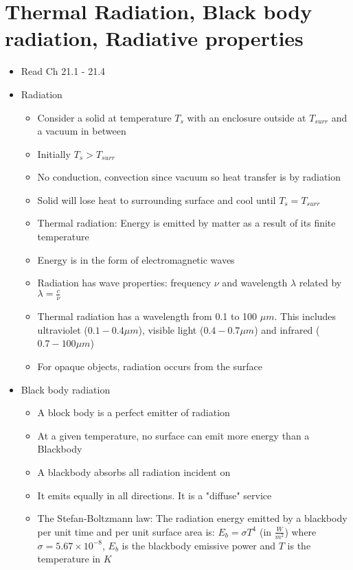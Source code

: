 \documentclass[12pt]{article}
\begin{document}
\section{Thermal Radiation, Black body radiation, Radiative properties}

\begin{itemize}
    \item Read Ch 21.1 - 21.4
    \item Radiation \begin{itemize}
        \item Consider a solid at temperature $T_s$ with an enclosure outside at $T_{surr}$ and a vacuum in between
        \item Initially $T_s > T_{surr}$
        \item No conduction, convection since vacuum so heat transfer is by radiation
        \item Solid will lose heat to surrounding surface and cool until $T_s = T_{surr}$
        \item Thermal radiation: Energy is emitted by matter as a result of its finite temperature
        \item Energy is in the form of electromagnetic waves
        \item Radiation has wave properties: frequency $\nu$ and wavelength $\lambda$ related by $\lambda = \frac{c}{\nu}$
        \item Thermal radiation has a wavelength from 0.1 to 100 $\mu m$. This includes ultraviolet ($0.1 - 0.4 \mu m$), visible light ($0.4 - 0.7 \mu m$) and infrared ($0.7 - 100 \mu m$)
        \item For opaque objects, radiation occurs from the surface
    \end{itemize}
    \item Black body radiation \begin{itemize}
        \item A block body is a perfect emitter of radiation
        \item At a given temperature, no surface can emit more energy than a Blackbody
        \item A blackbody absorbs all radiation incident on 
        \item It emits equally in all directions. It is a "diffuse" service
        \item The Stefan-Boltzmann law: The radiation energy emitted by a blackbody per unit time and per unit surface area is: $E_b = \sigma T^4$ (in $\frac{W}{m^2}$) where $\sigma = 5.67 \times 10^{-8}$, $E_b$ is the blackbody emissive power and $T$ is the temperature in $K$

\end{itemize}
\end{itemize}
\end{document}
